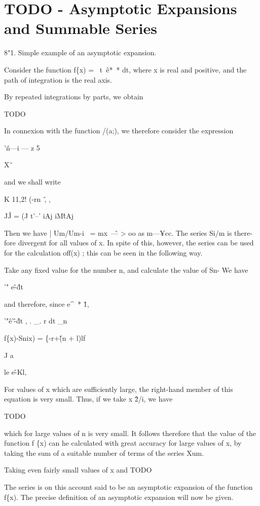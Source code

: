 \chapter{TODO - Asymptotic Expansions and Summable Series}

8"1. Simple example of an asymptotic expansion. 

Consider the function f\{x) = \ t~\^ e*~* dt, where x is real and positive, 
and the path of integration is the real axis. 

By repeated integrations by parts, we obtain 

TODO

In connexion with the function /(a;), we therefore consider the expression 

'\^n—i — z 5 

X\^ \ 

and we shall write 

K 11,2! (-rn\ \^ , , 

J\^J = (J t'--' iAj iM\^ tAj 

Then we have | Um/Um-i \ = mx~\^ — > oo as m—¥cc. The series Si/m is there- 
fore divergent for all values of x. In spite of this, however, the series can 
be used for the calculation off(x) ; this can be seen in the following way. 

Take any fixed value for the number n, and calculate the value of Sn- 
We have 

'" e\^-\^ dt 

and therefore, since e\^~* \^ 1, 

'"\^ e'\^-\^dt , . \_. r dt \_n\ 



f\{x)-Snix) = \{-r+\^(n + l)lf 

J a 

le e\^-Kl, 



For values of x which are sufficiently large, the right-hand member of this 
equation is very small. Thus, if we take x \^ 2/i, we have 

TODO

which for large values of n is very small. It follows therefore that the value 
of the function f \{x) can he calculated with great accuracy for large values of x, 
by taking the sum of a suitable number of terms of the series Xum. 

Taking even fairly small values of x and TODO

%
%

The series is on this account said to be an asymptotic expansion of the 
function f\{x). The precise definition of an asymptotic expansion will now 
be given. 

